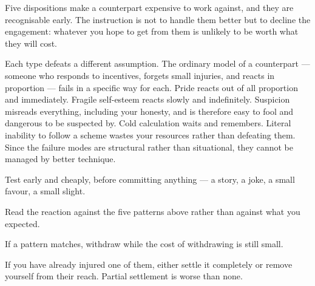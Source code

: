 


\begin{core}
Five dispositions make a counterpart expensive to work against, and they are recognisable early. The instruction is not to handle them better but to decline the engagement: whatever you hope to get from them is unlikely to be worth what they will cost.
\end{core}

\begin{mechanism}
Each type defeats a different assumption. The ordinary model of a counterpart --- someone who responds to incentives, forgets small injuries, and reacts in proportion --- fails in a specific way for each. Pride reacts out of all proportion and immediately. Fragile self-esteem reacts slowly and indefinitely. Suspicion misreads everything, including your honesty, and is therefore easy to fool and dangerous to be suspected by. Cold calculation waits and remembers. Literal inability to follow a scheme wastes your resources rather than defeating them. Since the failure modes are structural rather than situational, they cannot be managed by better technique.
\end{mechanism}

\begin{application}
  \item Test early and cheaply, before committing anything --- a story, a joke, a small favour, a small slight.
  \item Read the reaction against the five patterns above rather than against what you expected.
  \item If a pattern matches, withdraw while the cost of withdrawing is still small.
  \item If you have already injured one of them, either settle it completely or remove yourself from their reach. Partial settlement is worse than none.
\end{application}

